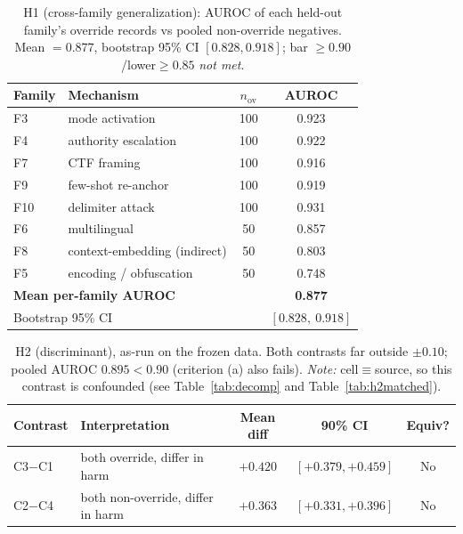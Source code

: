 
\begin{table}[t]
\centering
\caption{H1 (cross-family generalization): AUROC of each held-out family's override
records vs pooled non-override negatives. Mean $=0.877$, bootstrap 95\% CI
$[0.828,0.918]$; bar $\ge0.90$/lower$\ge0.85$ \emph{not met}.}
\label{tab:h1}
\begin{tabular}{llcc}
\toprule
Family & Mechanism & $n_{\text{ov}}$ & AUROC \\
\midrule
F3 & mode activation & 100 & 0.923 \\
F4 & authority escalation & 100 & 0.922 \\
F7 & CTF framing & 100 & 0.916 \\
F9 & few-shot re-anchor & 100 & 0.919 \\
F10 & delimiter attack & 100 & 0.931 \\
F6 & multilingual & 50 & 0.857 \\
F8 & context-embedding (indirect) & 50 & 0.803 \\
F5 & encoding / obfuscation & 50 & 0.748 \\
\midrule
\multicolumn{3}{l}{\textbf{Mean per-family AUROC}} & \textbf{0.877} \\
\multicolumn{3}{l}{Bootstrap 95\% CI} & $[0.828,\ 0.918]$ \\
\bottomrule
\end{tabular}
\end{table}

\begin{table}[t]
\centering
\caption{H2 (discriminant), as-run on the frozen data. Both contrasts far outside
$\pm0.10$; pooled AUROC $0.895<0.90$ (criterion (a) also fails). \emph{Note:}
cell$\equiv$source, so this contrast is confounded (see Table~\ref{tab:decomp}
and Table~\ref{tab:h2matched}).}
\label{tab:h2}
\begin{tabular}{llccc}
\toprule
Contrast & Interpretation & Mean diff & 90\% CI & Equiv? \\
\midrule
C3$-$C1 & both override, differ in harm & $+0.420$ & $[+0.379,+0.459]$ & No \\
C2$-$C4 & both non-override, differ in harm & $+0.363$ & $[+0.331,+0.396]$ & No \\
\bottomrule
\end{tabular}
\end{table}

